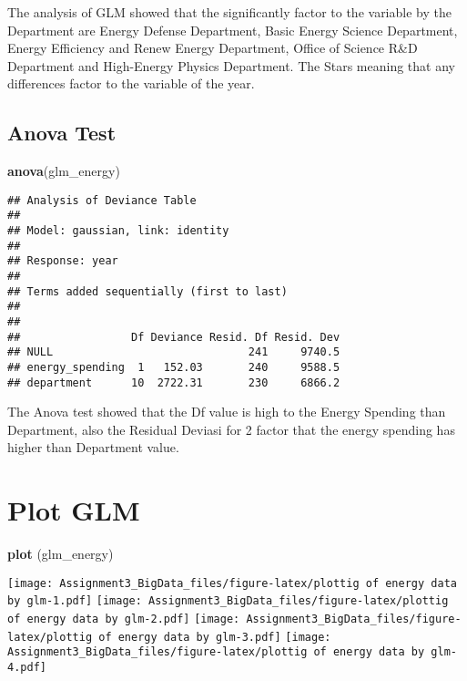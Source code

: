 \documentclass[]{article}
\newenvironment{Shaded}{\begin{snugshade}}{\end{snugshade}}
\newcommand{\KeywordTok}[1]{\textcolor[rgb]{0.13,0.29,0.53}{\textbf{#1}}}
\newcommand{\NormalTok}[1]{#1}
\begin{document}
The analysis of GLM showed that the significantly factor to the variable
by the Department are Energy Defense Department, Basic Energy Science
Department, Energy Efficiency and Renew Energy Department, Office of
Science R\&D Department and High-Energy Physics Department. The Stars
meaning that any differences factor to the variable of the year.

\subsection{Anova Test}\label{anova-test}

\begin{Shaded}
\begin{Highlighting}[]
\KeywordTok{anova}\NormalTok{(glm_energy)}
\end{Highlighting}
\end{Shaded}

\begin{verbatim}
## Analysis of Deviance Table
## 
## Model: gaussian, link: identity
## 
## Response: year
## 
## Terms added sequentially (first to last)
## 
## 
##                 Df Deviance Resid. Df Resid. Dev
## NULL                              241     9740.5
## energy_spending  1   152.03       240     9588.5
## department      10  2722.31       230     6866.2
\end{verbatim}

The Anova test showed that the Df value is high to the Energy Spending
than Department, also the Residual Deviasi for 2 factor that the energy
spending has higher than Department value.

\section{Plot GLM}\label{plot-glm}

\begin{Shaded}
\begin{Highlighting}[]
\KeywordTok{plot}\NormalTok{ (glm_energy)}
\end{Highlighting}
\end{Shaded}

\texttt{[image: Assignment3\_BigData\_files/figure-latex/plottig of energy data by glm-1.pdf]}
\texttt{[image: Assignment3\_BigData\_files/figure-latex/plottig of energy data by glm-2.pdf]}
\texttt{[image: Assignment3\_BigData\_files/figure-latex/plottig of energy data by glm-3.pdf]}
\texttt{[image: Assignment3\_BigData\_files/figure-latex/plottig of energy data by glm-4.pdf]}
\end{document}
